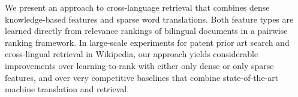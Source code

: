 We present an approach to cross-language retrieval that combines dense knowledge-based features and sparse word translations. Both feature types are learned directly from relevance rankings of bilingual documents in a pairwise ranking framework. In large-scale experiments for patent prior art search and cross-lingual retrieval in Wikipedia, our approach yields considerable improvements over learning-to-rank with either only dense or only sparse features, and over very competitive baselines that combine state-of-the-art machine translation and retrieval.
